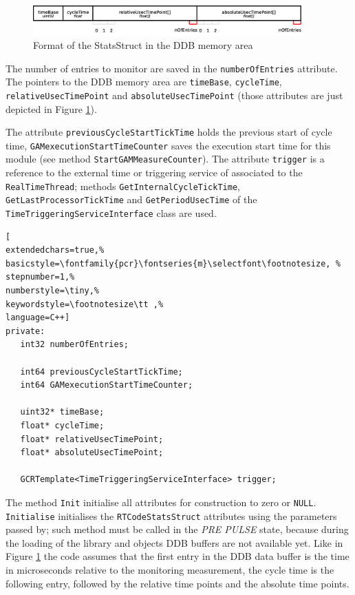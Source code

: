 \begin{figure}[h!]
 \begin{center}
  \includegraphics[width=0.92\textwidth]{MARTe/StatsStruct.eps}
  \caption{Format of the StatsStruct in the DDB memory area}
  \label{f:MARTe:StatsStruct}
 \end{center}
\end{figure}

The number of entries to monitor are saved in the \texttt{numberOfEntries} attribute. The pointers to the DDB memory area are \texttt{timeBase}, \texttt{cycleTime}, \texttt{relativeUsecTimePoint} and \texttt{absoluteUsecTimePoint} (those attributes are just depicted in Figure \ref{f:MARTe:StatsStruct}).

The attribute \texttt{previousCycleStartTickTime} holds the previous start of cycle time, \texttt{GAMexecutionStartTimeCounter} saves the execution start time for this module (see method \texttt{StartGAMMeasureCounter}). The attribute \texttt{trigger} is a reference to the external time or triggering service of associated to the \texttt{RealTimeThread}; methods \texttt{GetInternalCycleTickTime}, \texttt{GetLastProcessorTickTime} and \texttt{GetPeriodUsecTime} of the \texttt{TimeTriggeringServiceInterface} class are used.

\begin{lstlisting}[
extendedchars=true,%
basicstyle=\fontfamily{pcr}\fontseries{m}\selectfont\footnotesize, %
stepnumber=1,%
numberstyle=\tiny,%
keywordstyle=\footnotesize\tt ,%
language=C++]
private:
   int32 numberOfEntries;

   int64 previousCycleStartTickTime;
   int64 GAMexecutionStartTimeCounter;

   uint32* timeBase;
   float* cycleTime;
   float* relativeUsecTimePoint;
   float* absoluteUsecTimePoint;

   GCRTemplate<TimeTriggeringServiceInterface> trigger;
\end{lstlisting}

The method \texttt{Init} initialise all attributes for construction to zero or \texttt{NULL}. \texttt{Initialise} initialises the \texttt{RTCodeStatsStruct} attributes using the parameters passed by; such method must be called in the \textit{PRE PULSE} state, because during the loading of the library and objects DDB buffers are not available yet. Like in Figure \ref{f:MARTe:StatsStruct} the code assumes that the first entry in the DDB data buffer is the time in microseconds relative to the monitoring measurement, the cycle time is the following entry, followed by the relative time points and the absolute time points. \\

